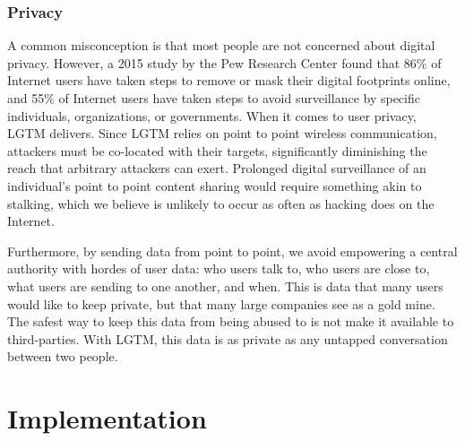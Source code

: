 \documentclass[12pt]{report}
\begin{document}



\subsection{Privacy} %
A common misconception is that most people are not concerned about digital privacy. However, a 2015 study by the Pew Research Center \cite{AmericanPrivacyOnlinePew2015} found that 86\% of Internet users have taken steps to remove or mask their digital footprints online, and 55\% of Internet users have taken steps to avoid surveillance by specific individuals, organizations, or governments. When it comes to user privacy, LGTM delivers. Since LGTM relies on point to point wireless communication, attackers must be co-located with their targets, significantly diminishing the reach that arbitrary attackers can exert. Prolonged digital surveillance of an individual's point to point content sharing would require something akin to stalking, which we believe is unlikely to occur as often as hacking does on the Internet. \par

Furthermore, by sending data from point to point, we avoid empowering a central authority with hordes of user data: who users talk to, who users are close to, what users are sending to one another, and when. This is data that many users would like to keep private, but that many large companies see as a gold mine. The safest way to keep this data from being abused to is not make it available to third-parties. With LGTM, this data is as private as any untapped conversation between two people. \par


\chapter{Implementation}
\end{document}
